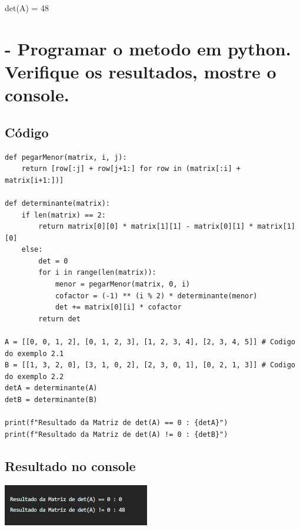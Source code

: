 \documentclass[a4paper, 12pt]{article}
\begin{document}
\centerline{det(A) = 48}

\section{- Programar o metodo em python. Verifique os resultados, mostre o console.}

\begin{scriptsize}
\subsection{Código}
\begin{lstlisting}
def pegarMenor(matrix, i, j):
    return [row[:j] + row[j+1:] for row in (matrix[:i] + matrix[i+1:])]

def determinante(matrix):
    if len(matrix) == 2:
        return matrix[0][0] * matrix[1][1] - matrix[0][1] * matrix[1][0]
    else:
        det = 0
        for i in range(len(matrix)): 
            menor = pegarMenor(matrix, 0, i)
            cofactor = (-1) ** (i % 2) * determinante(menor)
            det += matrix[0][i] * cofactor
        return det

A = [[0, 0, 1, 2], [0, 1, 2, 3], [1, 2, 3, 4], [2, 3, 4, 5]] # Codigo do exemplo 2.1
B = [[1, 3, 2, 0], [3, 1, 0, 2], [2, 3, 0, 1], [0, 2, 1, 3]] # Codigo do exemplo 2.2
detA = determinante(A)
detB = determinante(B)

print(f"Resultado da Matriz de det(A) == 0 : {detA}")
print(f"Resultado da Matriz de det(A) != 0 : {detB}")
\end{lstlisting}
\end{scriptsize}

\subsection{Resultado no console}
\center\includegraphics{Console.jpg}
\end{document}
